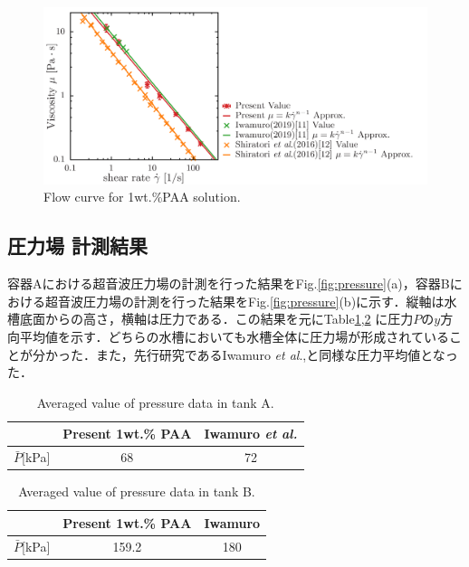\begin{figure}[ht]
    \centering
    \includegraphics[width=13cm,clip]{4-Results/PAA-viscosity.png}
    \caption{Flow curve for 1wt.\%PAA solution.}
    \label{fig:PAA-vis}
\end{figure}

\newpage

\subsection{圧力場 計測結果}

容器Aにおける超音波圧力場の計測を行った結果をFig.\ref{fig:pressure}(a)，容器Bにおける超音波圧力場の計測を行った結果をFig.\ref{fig:pressure}(b)に示す．縦軸は水槽底面からの高さ，横軸は圧力である．この結果を元にTable\ref{table:press-A},\ref{table:press-B} に圧力$P$の$y$方向平均値を示す．どちらの水槽においても水槽全体に圧力場が形成されていることが分かった．また，先行研究であるIwamuro \textit{et al}.\cite{ref:8},\cite{ref:9}と同様な圧力平均値となった．

\begin{table}[h]
    \centering
    \caption{Averaged value of pressure data in tank A.}
    \label{table:press-A}
    \begin{tabular}{c|c|c}\hline
                       & Present 1wt.\% PAA & Iwamuro {\it et al.}\cite{ref:8} \\ \hline
        $\bar{P}$[kPa] &       68        & 72                              \\ \hline
    \end{tabular}
\end{table}

\begin{table}[h]
    \centering
    \caption{Averaged value of pressure data in tank B.}
    \label{table:press-B}
    \begin{tabular}{c|c|c}\hline
                       & Present 1wt.\% PAA & Iwamuro \cite{ref:9} \\ \hline
        $\bar{P}$[kPa] & 159.2              & 180                              \\ \hline
    \end{tabular}
\end{table}

